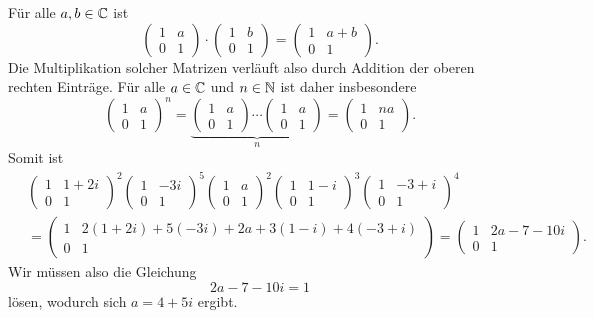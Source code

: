\documentclass[a4paper,10pt]{article}
\begin{document}
\section{}
Für alle $a,b \in \mathbb{C}$ ist
\[
 \begin{pmatrix}
  1 & a \\
  0 & 1
 \end{pmatrix}
 \cdot
 \begin{pmatrix}
  1 & b \\
  0 & 1
 \end{pmatrix}
 =
 \begin{pmatrix}
  1 & a+b \\
  0 & 1
 \end{pmatrix}.
\]
Die Multiplikation solcher Matrizen verläuft also durch Addition der oberen rechten Einträge. Für alle $a \in \mathbb{C}$ und $n \in \mathbb{N}$ ist daher insbesondere
\[
 \begin{pmatrix}
  1 & a \\
  0 & 1
 \end{pmatrix}^n
 =
 \underbrace{
 \begin{pmatrix}
  1 & a \\
  0 & 1
 \end{pmatrix}
 \dotsm
 \begin{pmatrix}
  1 & a \\
  0 & 1
 \end{pmatrix}
 }_{n}
 =
 \begin{pmatrix}
  1 & na \\
  0 & 1
 \end{pmatrix}.
\]
Somit ist
\begin{align*}
 &\,
 \begin{pmatrix}
   1 & 1+2i \\
   0 & 1
 \end{pmatrix}^2
  \begin{pmatrix}
   1 & -3i \\
   0 &  1
 \end{pmatrix}^5
  \begin{pmatrix}
   1 & a \\
   0 & 1
 \end{pmatrix}^2
  \begin{pmatrix}
   1 & 1-i \\
   0 & 1
 \end{pmatrix}^3
  \begin{pmatrix}
   1 & -3+i \\
   0 &  1
 \end{pmatrix}^4 \\
 &\,=
 \begin{pmatrix}
  1 & 2(1+2i)+5(-3i)+2a+3(1-i)+4(-3+i) \\
  0 & 1
 \end{pmatrix}
 =
 \begin{pmatrix}
  1 &  2a-7-10i \\
  0 & 1
 \end{pmatrix}.
\end{align*}
Wir müssen also die Gleichung
\[
 2a-7-10i = 1
\]
lösen, wodurch sich $a = 4+5i$ ergibt.
\end{document}
